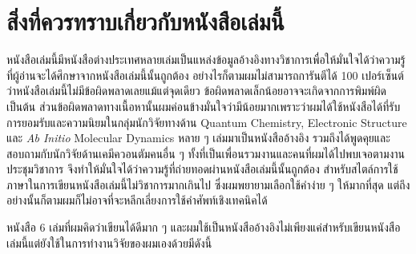 

{

\chapter*{\centering สิ่งที่ควรทราบเกี่ยวกับหนังสือเล่มนี้}

หนังสือเล่มนี้มีหนังสือต่างประเทศหลายเล่มเป็นแหล่งข้อมูลอ้างอิงทางวิชาการเพื่อให้มั่นใจได้ว่าความรู้ที่ผู้อ่านจะได้ศึกษาจากหนังสือเล่มนี้นั้นถูกต้อง
อย่างไรก็ตามผมไม่สามารถการันตีได้ 100 เปอร์เซ็นต์ว่าหนังสือเล่มนี้ไม่มีข้อผิดพลาดเลยแม้แต่จุดเดียว ข้อผิดพลาดเล็กน้อยอาจจะเกิดจากการพิมพ์ผิด 
เป็นต้น ส่วนข้อผิดพลาดทางเนื้อหานั้นผมค่อนข้างมั่นใจว่ามีน้อยมากเพราะว่าผมได้ใช้หนังสือได้ที่รับการยอมรับและความนิยมในกลุ่มนักวิจัยทางด้าน 
Quantum Chemistry, Electronic Structure และ \textit{Ab Initio} Molecular Dynamics หลาย ๆ เล่มมาเป็นหนังสืออ้างอิง 
รวมถึงได้พูดคุยและสอบถามกับนักวิจัยด้านเคมีควอนตัมคนอื่น ๆ ทั้งที่เป็นเพื่อนรวมงานและคนที่ผมได้ไปพบเจอตามงานประชุมวิชาการ 
จึงทำให้มั่นใจได้ว่าความรู้ที่ถ่ายทอดผ่านหนังสือเล่มนี้นั้นถูกต้อง สำหรับสไตล์การใช้ภาษาในการเขียนหนังสือเล่มนี้ไม่วิชาการมากเกินไป 
ซึ่งผมพยายามเลือกใช้คำง่าย ๆ ให้มากที่สุด แต่ถึงอย่างนั้นก็ตามผมก็ไม่อาจที่จะหลีกเลี่ยงการใช้คำศัพท์เชิงเทคนิคได้

หนังสือ 6 เล่มที่ผมคิดว่าเขียนได้ดีมาก ๆ และผมใช้เป็นหนังสืออ้างอิงไม่เพียงแค่สำหรับเขียนหนังสือเล่มนี้แต่ยังใช้ในการทำงานวิจัยของผมเองด้วยมีดังนี้

}
